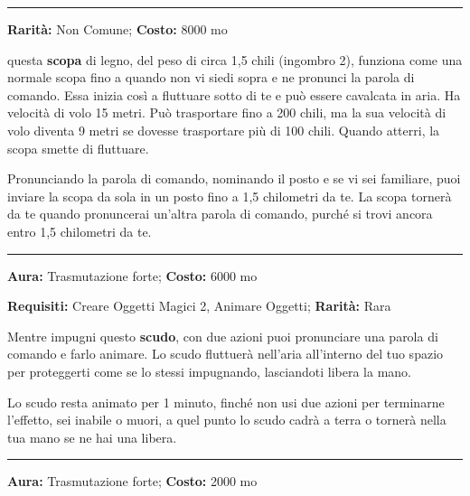 \begin{multicols}{2}
\smallskip\noindent\rule{\linewidth}{2pt}  \hypertarget{ScopaVolante}{}\smallskip{}\noindent\label{ScopaVolante}

\textbf{Rarità:} Non Comune; \textbf{Costo:} 8000 mo

questa \textbf{scopa} di legno, del peso di circa 1,5 chili (ingombro 2), funziona come una normale scopa fino a quando non vi siedi sopra e ne pronunci la parola di comando. Essa inizia così a fluttuare sotto di te e può essere cavalcata in aria. Ha velocità di volo 15 metri. Può trasportare fino a 200 chili, ma la sua velocità di volo diventa 9 metri se dovesse trasportare più di 100 chili. Quando atterri, la scopa smette di fluttuare.

Pronunciando la parola di comando, nominando il posto e se vi sei familiare, puoi inviare la scopa da sola in un posto fino a 1,5 chilometri da te. La scopa tornerà da te quando pronuncerai un'altra parola di comando, purché si trovi ancora entro 1,5 chilometri da te.

\smallskip\noindent\rule{\linewidth}{2pt}  \hypertarget{ScudoAnimato}{}\smallskip{}\noindent\label{ScudoAnimato}

\textbf{Aura:} Trasmutazione forte; \textbf{Costo:} 6000 mo

\textbf{Requisiti:} Creare Oggetti Magici 2, Animare Oggetti; \textbf{Rarità:} Rara

Mentre impugni questo \textbf{scudo}, con due azioni puoi pronunciare una parola di comando e farlo animare. Lo scudo fluttuerà nell'aria all'interno del tuo spazio per proteggerti come se lo stessi impugnando, lasciandoti libera la mano.

Lo scudo resta animato per 1 minuto, finché non usi due azioni per terminarne l'effetto, sei inabile o muori, a quel punto lo scudo cadrà a terra o tornerà nella tua mano se ne hai una libera.

\smallskip\noindent\rule{\linewidth}{2pt}  \hypertarget{Scudodell'AttrazionedeiProiettili}{}\smallskip{}\noindent\label{Scudodell'AttrazionedeiProiettili}

\textbf{Aura:} Trasmutazione forte; \textbf{Costo:} 2000 mo


\end{multicols}
